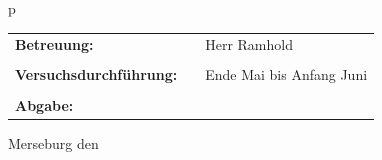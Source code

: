\begin{center}
\begin{tabular}{p{\textwidth}}
\begin{center}
\begin{tabular}{lll}
\large{\textbf{Betreuung:}}&& \large{Herr Ramhold}\\
&&\\
\large{\textbf{Versuchsdurchführung:}}&& \large{Ende Mai bis Anfang Juni}\\
&&\\
\large{\textbf{Abgabe:}}&& \large{\todayDE}\\
\end{tabular}
\end{center}

\end{tabular}
\end{center}
\vfill
\large{Merseburg den \todayDE}
